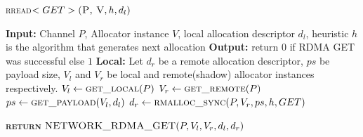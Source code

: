 \documentclass[10pt]{article}
\begin{document}
\begin{algorithm}{}
\footnotesize
\caption{\textsc{rread}{$<GET>\textsc{(P, V}, h, d_l)$}}
\label{alg:rread_GET} 
\begin{algorithmic}[1]


\STATE \textbf{Input:} Channel $P$, Allocator instance $V$, local allocation descriptor $d_l$,  heuristic $h$ is the algorithm that generates next allocation
\STATE \textbf{Output:} return {$0$} if RDMA GET was successful else {$1$}
\STATE \textbf{Local:} Let $d_r$ be a remote allocation descriptor,  $ps$ be payload size, $V_l$ and $V_r$ be local and remote(shadow) allocator instances respectively.
\STATE \quad $\textbf{$V_l$} \leftarrow  \textsc{get\_local}(P)$ 
\STATE \quad $\textbf{$V_r$} \leftarrow  \textsc{get\_remote}(P)$ 
\STATE \quad $\textbf{$ps$} \leftarrow  \textsc{get\_payload}(V_l, d_l)$ 
\STATE \quad $\textbf{$d_r$} \leftarrow  \textsc{rmalloc\_sync}(P, V_r, ps, h, GET)$ 

\STATE \textsc{\textbf{return}} {$\textsc{NETWORK\_RDMA\_GET}(P, V_l, V_r, d_l, d_r)$}
\STATE


\end{algorithmic}
\end{algorithm}


\end{document}
